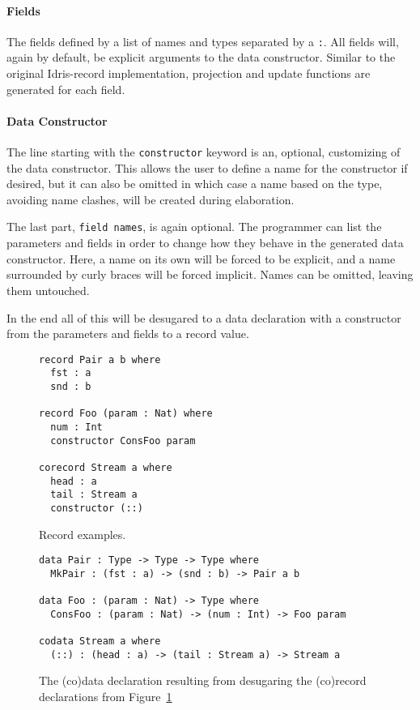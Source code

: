 \paragraph{Fields}
The fields defined by a list of names and types separated by a \texttt{:}. All
fields will, again by default, be explicit arguments to the data
constructor. Similar to the original Idris-record implementation, projection and
update functions are generated for each field.
\paragraph{Data Constructor}
The line starting with the \texttt{constructor} keyword is an, optional,
customizing of the data constructor. This allows the user to define a name for
the constructor if desired, but it can also be omitted in which case a name
based on the type, avoiding name clashes, will be created during elaboration.

The last part, \texttt{field names}, is again optional. The programmer can list
the parameters and fields in order to change how they behave in the generated
data constructor. Here, a name on its own will be forced to be explicit, and a
name surrounded by curly braces will be forced implicit. Names can be omitted,
leaving them untouched.

In the end all of this will be desugared to a data declaration with a
constructor from the parameters and fields to a record value.

\begin{figure}[h]
\begin{lstlisting}
record Pair a b where
  fst : a
  snd : b

record Foo (param : Nat) where
  num : Int
  constructor ConsFoo param

corecord Stream a where
  head : a
  tail : Stream a
  constructor (::)
\end{lstlisting}
  \caption{Record examples.}
  \label{fig:new_record_examples}
\end{figure}

\begin{figure}[h]
\begin{lstlisting}
data Pair : Type -> Type -> Type where
  MkPair : (fst : a) -> (snd : b) -> Pair a b

data Foo : (param : Nat) -> Type where
  ConsFoo : (param : Nat) -> (num : Int) -> Foo param

codata Stream a where
  (::) : (head : a) -> (tail : Stream a) -> Stream a
\end{lstlisting}
  \caption{The (co)data declaration resulting from desugaring the (co)record
    declarations from Figure~\ref{fig:new_record_examples}}
  \label{fig:new_record_examples_desugared}
\end{figure}

